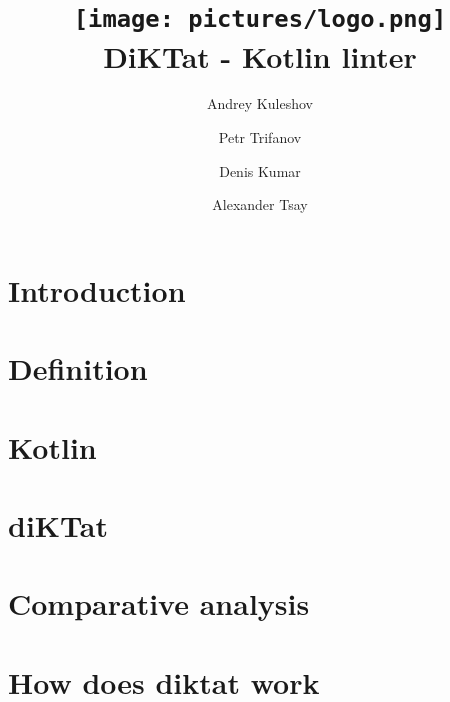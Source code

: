\documentclass[acmlarge, screen, nonacm]{acmart}
\begin{document}
\title[]{
  \texttt{[image: pictures/logo.png]}\\
  DiKTat - Kotlin linter
}

\author{Andrey Kuleshov}
\author{Petr Trifanov}
\author{Denis Kumar}
\author{Alexander Tsay}

\renewcommand{\shortauthors}{}

\maketitle

\section{Introduction}
\label{sec:intro}


\section{Definition}
\label{sec:definition}


\section{Kotlin}
\label{sec:kotlin}


\section{diKTat}
\label{sec:diKTat}


\section{Comparative analysis}
\label{sec:compare}


\section{How does diktat work}
\label{sec:work}

\end{document}
